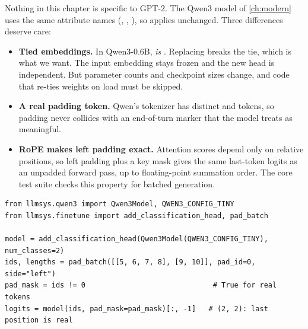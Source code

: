Nothing in this chapter is specific to GPT-2. The Qwen3 model of \cref{ch:modern} uses
the same attribute names (, , ), so
 applies unchanged. Three differences deserve care:
\begin{itemize}
\item \textbf{Tied embeddings.} In Qwen3-0.6B,  \emph{is}
. Replacing  breaks the tie, which is what we want.
The input embedding stays frozen and the new head is independent. But parameter counts
and checkpoint sizes change, and code that re-ties weights on load must be skipped.
\item \textbf{A real padding token.} Qwen's tokenizer has distinct
 and  tokens, so padding never collides with an
end-of-turn marker that the model treats as meaningful.
\item \textbf{RoPE makes left padding exact.} Attention scores depend only on relative
positions, so left padding plus a key mask gives the same last-token logits as an
unpadded forward pass, up to floating-point summation order. The core test suite checks
this property for batched generation.
\end{itemize}

\begin{lstlisting}[caption={The same recipe on a Qwen3-shaped model (tiny config shown).},label={lst:classify:qwen}]
from llmsys.qwen3 import Qwen3Model, QWEN3_CONFIG_TINY
from llmsys.finetune import add_classification_head, pad_batch

model = add_classification_head(Qwen3Model(QWEN3_CONFIG_TINY), num_classes=2)
ids, lengths = pad_batch([[5, 6, 7, 8], [9, 10]], pad_id=0, side="left")
pad_mask = ids != 0                              # True for real tokens
logits = model(ids, pad_mask=pad_mask)[:, -1]   # (2, 2): last position is real
\end{lstlisting}

